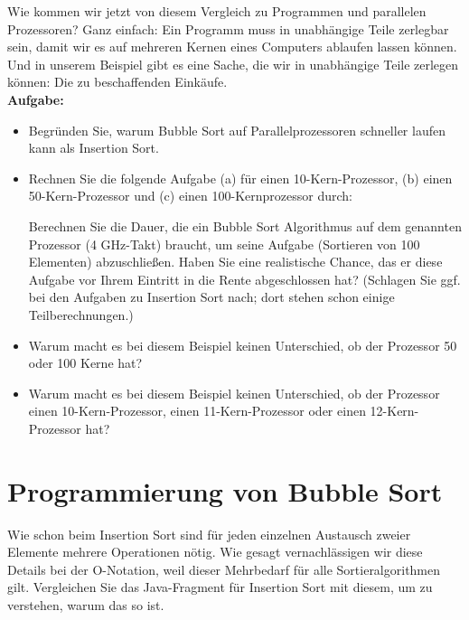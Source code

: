 Wie kommen wir jetzt von diesem Vergleich zu Programmen und parallelen Prozessoren? Ganz einfach: Ein Programm muss in unabhängige Teile zerlegbar sein, damit wir es auf mehreren Kernen eines Computers ablaufen lassen können. Und in unserem Beispiel gibt es eine Sache, die wir in unabhängige Teile zerlegen können: Die zu beschaffenden Einkäufe.\\

\textbf{Aufgabe:}

\begin{itemize}
	\item Begründen Sie, warum Bubble Sort auf Parallelprozessoren schneller laufen kann als Insertion Sort.
	\item Rechnen Sie die folgende Aufgabe (a) für einen 10-Kern-Prozessor, (b) einen 50-Kern-Prozessor und (c) einen 100-Kernprozessor durch:
	
	Berechnen Sie die Dauer, die ein Bubble Sort Algorithmus auf dem genannten Prozessor (4 GHz-Takt) braucht, um seine Aufgabe (Sortieren von 100 Elementen) abzuschließen. Haben Sie eine realistische Chance, das er diese Aufgabe vor Ihrem Eintritt in die Rente abgeschlossen hat? (Schlagen Sie ggf. bei den Aufgaben zu Insertion Sort nach; dort stehen schon einige Teilberechnungen.)
	
	\item Warum macht es bei diesem Beispiel keinen Unterschied, ob der Prozessor 50 oder 100 Kerne hat?
	\item Warum macht es bei diesem Beispiel keinen Unterschied, ob der Prozessor einen 10-Kern-Prozessor, einen 11-Kern-Prozessor oder einen 12-Kern-Prozessor hat?
\end{itemize}

\section{Programmierung von Bubble Sort}

Wie schon beim Insertion Sort sind für jeden einzelnen Austausch zweier Elemente mehrere Operationen nötig. Wie gesagt vernachlässigen wir diese Details bei der O-Notation, weil dieser Mehrbedarf für alle Sortieralgorithmen gilt. Vergleichen Sie das Java-Fragment für Insertion Sort mit diesem, um zu verstehen, warum das so ist.

